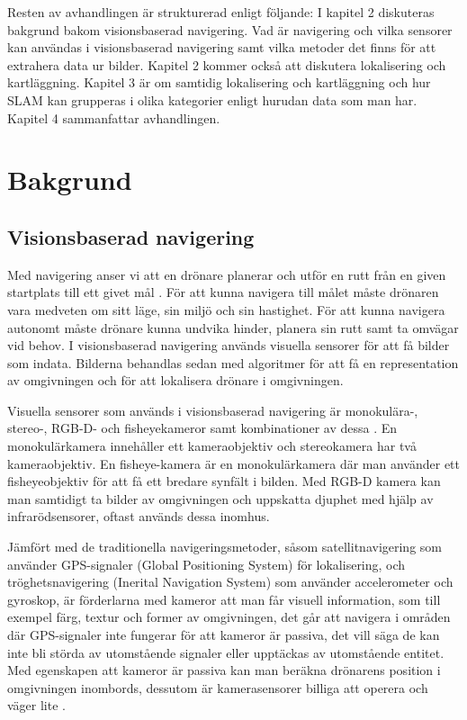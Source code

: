 Resten av avhandlingen är strukturerad enligt följande: I kapitel 2 diskuteras bakgrund bakom visionsbaserad navigering. Vad är navigering och vilka sensorer kan användas i visionsbaserad navigering samt vilka metoder det finns för att extrahera data ur bilder. Kapitel 2 kommer också att diskutera lokalisering och kartläggning. Kapitel 3 är om samtidig lokalisering och kartläggning och hur SLAM kan grupperas i olika kategorier enligt hurudan data som man har. Kapitel 4 sammanfattar avhandlingen.

\chapter{Bakgrund}

\section{Visionsbaserad navigering}

Med navigering anser vi att en drönare planerar och utför en rutt från en given startplats till ett givet mål \citep{geospatial}. För att kunna navigera till målet måste drönaren vara medveten om sitt läge, sin miljö och sin hastighet. För att kunna navigera autonomt måste drönare kunna undvika hinder, planera sin rutt samt ta omvägar vid behov. I visionsbaserad navigering används visuella sensorer för att få bilder som indata. Bilderna behandlas sedan med algoritmer för att få en representation av omgivningen och för att lokalisera drönare i omgivningen. 

Visuella sensorer som används i visionsbaserad navigering är monokulära-, stereo-, RGB-D- och fisheyekameror samt kombinationer av dessa \citep{geospatial}. En monokulärkamera innehåller ett kameraobjektiv och stereokamera har två kameraobjektiv. En fisheye-kamera är en monokulärkamera där man använder ett fisheyeobjektiv för att få ett bredare synfält i bilden. Med RGB-D kamera kan man samtidigt ta bilder av omgivningen och uppskatta djuphet med hjälp av infrarödsensorer, oftast används dessa inomhus. 

Jämfört med de traditionella navigeringsmetoder, såsom satellitnavigering som använder GPS-signaler (Global Positioning System) för lokalisering, och tröghetsnavigering (Inerital Navigation System) som använder accelerometer och gyroskop, är förderlarna med kameror att man får visuell information, som till exempel färg, textur och former av omgivningen, det går att navigera i områden där GPS-signaler inte fungerar för att kameror är passiva, det vill säga de kan inte bli störda av utomstående signaler eller upptäckas av utomstående entitet. Med egenskapen att kameror är passiva kan man beräkna drönarens position i omgivningen inombords, dessutom är kamerasensorer billiga att operera och väger lite \citep{opticalflowuav,geospatial}.

